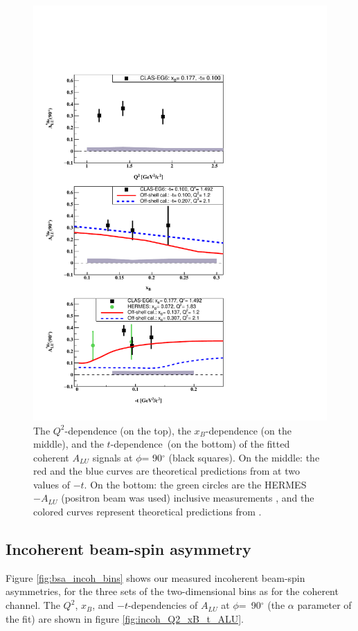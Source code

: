 \begin{figure}[tpb]
\centering
\includegraphics[scale=0.9]{fig_Dec2016/Coherent_ALU_phi_90.pdf}
   \caption{The $Q^{2}$-dependence (on the top), the $x_{B}$-dependence (on the 
      middle), and the $t$-dependence~(on the bottom) of the fitted coherent 
      $A_{LU}$ signals at $\phi$= 90$^{\circ}$ (black squares). On the middle: 
      the red and the blue curves are theoretical predictions from 
      \cite{simonetta_2} at two values of $-t$. On the bottom: the green 
      circles are the HERMES $-A_{LU}$ (positron beam was used) inclusive 
      measurements \cite{HERMES_BSA}, and the colored curves represent 
      theoretical predictions from \cite{simonetta_2}.} 
      \label{fig:coh_Q2_xB_t_ALU}
\end{figure}


\subsection{Incoherent beam-spin asymmetry}
Figure \ref{fig:bsa_incoh_bins} shows our measured incoherent beam-spin 
asymmetries, for the three sets of the two-dimensional bins as for the coherent 
channel. The $Q^2$, $x_{B}$, and $-t$-dependencies of $A_{LU}$ at 
$\phi$=~90$^{\circ}$ (the $\alpha$ parameter of the fit) are shown in figure 
\ref{fig:incoh_Q2_xB_t_ALU}.

